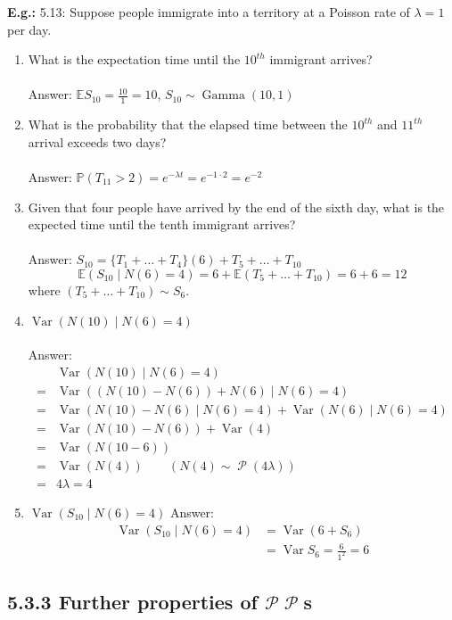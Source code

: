 \documentclass[a4paper]{article}
\newcommand{\n}{\hfill\break}
\newcommand{\eg}[1]{\par\noindent\settowidth{\hangindent}{\textbf{E.g.: }}\textbf{E.g.: }#1\n}
\newcommand{\Prob}{\mathbb{P}}
\renewcommand{\P}{\Prob}
\newcommand{\Avg}{\mathbb{E}}
\newcommand{\E}{\Avg}
\DeclareMathOperator{\Var}{Var}
\DeclareMathOperator{\Poiss}{\mathcal{P}}
\DeclareMathOperator{\Gam}{\text{Gamma}}
\begin{document}
\eg{
5.13: Suppose people immigrate into a territory at a Poisson rate of $\lambda=1$ per day.
\begin{enumerate}
    \item What is the expectation time until the $10^{th}$ immigrant arrives?
    \\\\
    Answer: $\E S_{10}=\frac{10}{1}=10$, $S_{10}\sim\Gam(10, 1)$
    
    \item What is the probability that the elapsed time between the $10^{th}$ and $11^{th}$ arrival exceeds two days?
    \\\\
    Answer: $\P(T_{11}>2)=e^{-\lambda t}=e^{-1\cdot 2}=e^{-2}$ %
    
    \item Given that four people have arrived by the end of the sixth day, what is the expected time until the tenth immigrant arrives?
    \\\\
    Answer: $S_{10}=\{T_1+\dots+T_4\}(6)+T_5+\dots+T_{10}$
    \[\E(S_{10}\mid N(6)=4)=6+\E(T_5+\dots+T_{10})=6+6=12\] where $(T_5+\dots+T_{10})\sim S_6$.
    
    \item $\Var(N(10)\mid N(6)=4)$
    \\\\
    Answer:
    \begin{align*}
        &\Var(N(10)\mid N(6)=4) \\
        =&\Var((N(10)-N(6))+N(6)\mid N(6)=4) \\
        =&\Var(N(10)-N(6)\mid N(6)=4)+\Var(N(6)\mid N(6)=4) \\
        =&\Var(N(10)-N(6))+\Var(4) \\
        =&\Var(N(10-6)) \\
        =&\Var(N(4)) \qquad(N(4)\sim\Poiss(4\lambda)) \\
        =&4\lambda=4
    \end{align*}
    
    \item $\Var(S_{10}\mid N(6)=4)$
    Answer:
    \begin{align*}
        \Var(S_{10}\mid N(6)=4)&=\Var(6+S_6) \\
        &=\Var S_6=\frac{6}{1^2}=6
    \end{align*}
\end{enumerate}
}

\subsection*{5.3.3 Further properties of $\mathcal{P}\Poiss$s}
\end{document}
